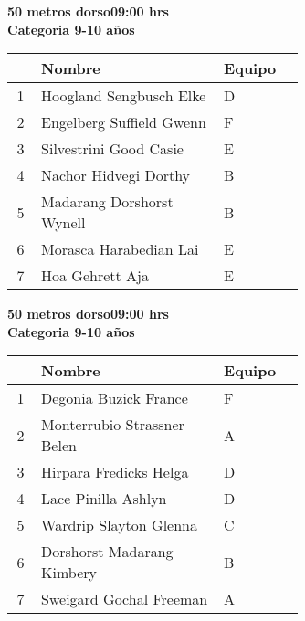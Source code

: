 \begin{minipage}{0.95\linewidth}\vspace{0.5cm} 
\begin{flushleft}
\textbf{
\hspace{-0.15cm}50 metros dorso\hspace{1.5cm}09:00 hrs \\Categoria 9-10 años}\vspace{-0.2cm} 
\end{flushleft}
\begin{tabular}{cp{0.63\linewidth}l}
\hline
& \textbf{Nombre} & \textbf{Equipo} \\ \hline
1 & Hoogland Sengbusch Elke & D \\ 
2 & Engelberg Suffield Gwenn & F \\ 
3 & Silvestrini Good Casie & E \\ 
4 & Nachor Hidvegi Dorthy & B \\ 
5 & Madarang Dorshorst Wynell & B \\ 
6 & Morasca Harabedian Lai & E \\ 
7 & Hoa Gehrett Aja & E \\ 
\end{tabular}
\end{minipage}
\begin{minipage}{0.95\linewidth}\vspace{0.5cm} 
\begin{flushleft}
\textbf{
\hspace{-0.15cm}50 metros dorso\hspace{1.5cm}09:00 hrs \\Categoria 9-10 años}\vspace{-0.2cm} 
\end{flushleft}
\begin{tabular}{cp{0.63\linewidth}l}
\hline
& \textbf{Nombre} & \textbf{Equipo} \\ \hline
1 & Degonia Buzick France & F \\ 
2 & Monterrubio Strassner Belen & A \\ 
3 & Hirpara Fredicks Helga & D \\ 
4 & Lace Pinilla Ashlyn & D \\ 
5 & Wardrip Slayton Glenna & C \\ 
6 & Dorshorst Madarang Kimbery & B \\ 
7 & Sweigard Gochal Freeman & A \\ 
\end{tabular}
\end{minipage}
